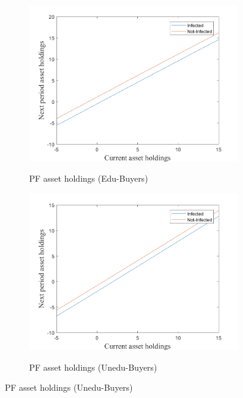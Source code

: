 \begin{figure}[H]\caption{Myopic onset of the epidemic}
\begin{subfigure}{0.5\textwidth}\caption{PF asset holdings (Edu-Buyers)}
   \includegraphics[width=\linewidth,height = 0.22\textheight]{figures/mio/FIG1.png}
    \label{fig_dert}
\end{subfigure}
\hspace*{\fill}
\begin{subfigure}{0.5\textwidth}\caption{PF asset holdings (Unedu-Buyers)}
   \includegraphics[width=\linewidth,height = 0.22\textheight]{figures/mio/FIG2.png}
    \label{fig:x_b}
\end{subfigure}

\end{figure}
